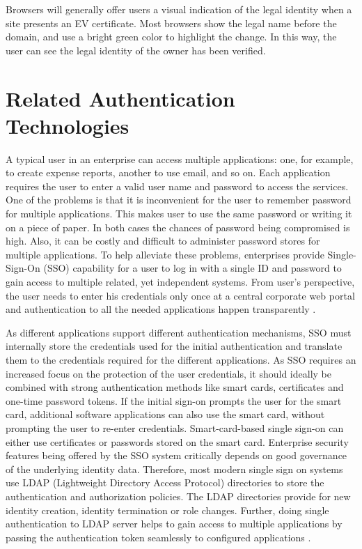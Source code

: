 \begin{multicols}{2}
Browsers will generally offer users a visual indication of the legal identity when a site presents an EV certificate. Most browsers show the legal name before the domain, and use a bright green color to highlight the change. In this way, the user can see the legal identity of the owner has been verified.\\[-22pt]

\section*{Related Authentication Technologies}

\vskip -3pt

A typical user in an enterprise can access multiple applications: one, for example, to create expense reports, another to use email, and so on. Each application requires the user to enter a valid user name and password to access the services. One of the problems is that it is inconvenient for the user to remember password for multiple applications. This makes user to use the same password or writing it on a piece of paper. In both cases the chances of password being compromised is high. Also, it can be costly and difficult to administer password stores for multiple applications. To help alleviate these problems, enterprises provide Single-Sign-On (SSO) capability for a user to log in with a single ID and password to gain access to multiple related, yet independent systems. From user's perspective, the user needs to enter his credentials only once at a central corporate web portal and authentication to all the needed applications happen transparently \cite{chap2-key19}.

As different applications support different authentication mechanisms, SSO must internally store the credentials used for the initial authentication and translate them to the credentials required for the different applications. As SSO requires an increased focus on the protection of the user credentials, it should ideally be combined with strong authentication methods like smart cards, certificates and one-time password tokens. If the initial sign-on prompts the user for the smart card, additional software applications can also use the smart card, without prompting the user to re-enter credentials. Smart-card-based single sign-on can either use certificates or passwords stored on the smart card. Enterprise security features being offered by the SSO system critically depends on good governance of the underlying identity data. Therefore, most modern single sign on systems use LDAP (Lightweight Directory Access Protocol) directories to store the authentication and authorization policies. The LDAP directories provide for new identity creation, identity termination or role changes. Further, doing single authentication to LDAP server helps to gain access to multiple applications by passing the authentication token seamlessly to configured applications \cite{chap2-key20}.


\end{multicols}
